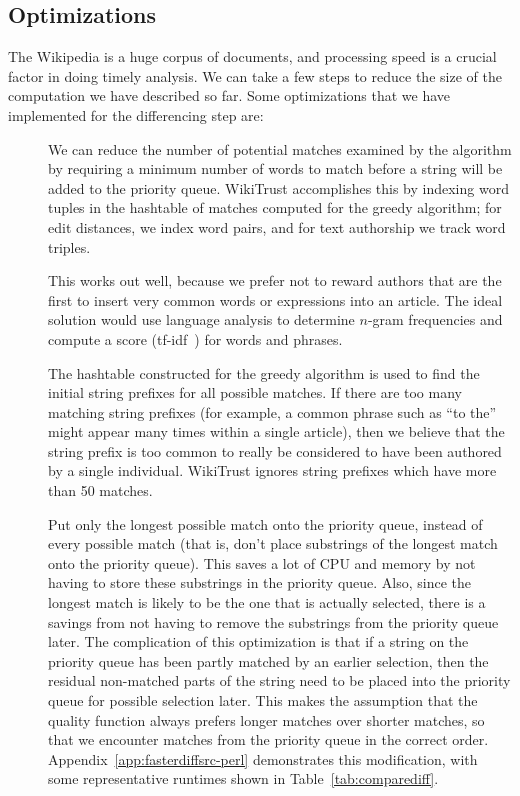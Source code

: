 \subsection{Optimizations}
\label{sec:diff-optimizations}

The Wikipedia is a huge corpus of documents, and processing speed
is a crucial factor in doing timely analysis.
We can take a few steps to reduce the size of the computation
we have described so far.
Some optimizations that we have implemented for the differencing
step are:
%
\begin{description}
\item[]
    We can reduce the number of potential matches examined
    by the algorithm by requiring a minimum number of words to match
    before a string will be added to the priority queue.
    WikiTrust accomplishes this by indexing word tuples in the
    hashtable of matches computed for the greedy algorithm;
    for edit distances, we index word pairs, and for text authorship
    we track word triples.

    This works out well, because we prefer not to reward authors that
    are the first to insert very common words or expressions into an
    article.
    The ideal solution would use language analysis to determine
    $n$-gram frequencies and compute
    a score (\eg tf-idf~\cite{Jones1972}) for words and phrases.


\item[]
    The hashtable constructed for the greedy algorithm is used
    to find the initial string prefixes for all possible matches.
    If there are too many matching string prefixes (for example,
    a common phrase such as ``to the'' might appear many times
    within a single article), then we believe that the string prefix
    is too common to really be considered to have been authored
    by a single individual.
    WikiTrust ignores string prefixes which have more than 50 matches.

\item[] Put only the longest possible match
    onto the priority queue, instead of every possible match (that is, don't
    place substrings of the longest match onto the priority queue).
    This saves a lot of CPU and memory by not having to store
    these substrings in the priority queue.
    Also, since the longest match is likely to be the one that is
    actually selected, there is a savings from not having to remove
    the substrings from the priority queue later.
    The complication of this optimization is that if a string on
    the priority queue has been partly matched by an earlier selection,
    then the residual non-matched parts of the string need to
    be placed into the priority queue for possible selection later.
    This makes the assumption that the quality function always
    prefers longer matches over shorter matches, so that we encounter
    matches from the priority queue in the correct order.
    Appendix~\ref{app:fasterdiffsrc-perl} demonstrates this
    modification, with some representative runtimes shown
    in Table~\ref{tab:comparediff}.


\end{description}

